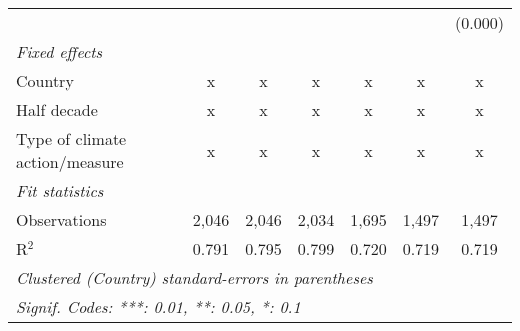 \begin{tabular}{lcccccc}
                                                                            &         &              &               &         &         & (0.000)\\   
   \emph{Fixed effects}\\
   Country                                                                  & x       & x            & x             & x       & x       & x\\  
   Half decade                                                              & x       & x            & x             & x       & x       & x\\  
   Type of climate action/measure                                           & x       & x            & x             & x       & x       & x\\  
   \midrule \emph{Fit statistics}\\
   Observations                                                             & 2,046   & 2,046        & 2,034         & 1,695   & 1,497   & 1,497\\  
   R$^2$                                                                    & 0.791   & 0.795        & 0.799         & 0.720   & 0.719   & 0.719\\  
   \midrule
   \multicolumn{7}{l}{\emph{Clustered (Country) standard-errors in parentheses}}\\
   \multicolumn{7}{l}{\emph{Signif. Codes: ***: 0.01, **: 0.05, *: 0.1}}\\
\end{tabular}
\par\endgroup


